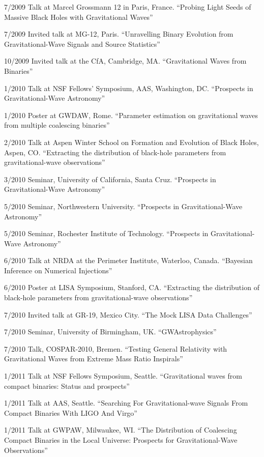 \documentclass[margin,line]{res}
\begin{document}
\begin{resume}
7/2009	Talk at Marcel Grossmann 12 in Paris, France.  ``Probing Light Seeds of Massive Black Holes with Gravitational Waves'' 

7/2009	Invited talk at MG-12, Paris.  ``Unravelling Binary Evolution from Gravitational-Wave Signals and Source Statistics''

10/2009	Invited talk at the CfA, Cambridge, MA.  ``Gravitational Waves from Binaries''

1/2010	Talk at NSF Fellows' Symposium, AAS, Washington, DC. ``Prospects in Gravitational-Wave Astronomy''

1/2010	Poster at GWDAW, Rome.  ``Parameter estimation on gravitational waves from multiple coalescing binaries''

2/2010	Talk at Aspen Winter School on Formation and Evolution of Black Holes, Aspen, CO.  ``Extracting the distribution of black-hole parameters from gravitational-wave observations''

3/2010	Seminar, University of California, Santa Cruz. ``Prospects in Gravitational-Wave Astronomy''

5/2010	Seminar, Northwestern University. ``Prospects in Gravitational-Wave Astronomy''

5/2010	Seminar, Rochester Institute of Technology. ``Prospects in Gravitational-Wave Astronomy''

6/2010	Talk at NRDA at the Perimeter Institute, Waterloo, Canada. ``Bayesian Inference on Numerical Injections''

6/2010	Poster at LISA Symposium, Stanford, CA.  ``Extracting the distribution of black-hole parameters from gravitational-wave observations''

7/2010	Invited talk at GR-19, Mexico City.  ``The Mock LISA Data Challenges''

7/2010	Seminar, University of Birmingham, UK.  ``GWAstrophysics''

7/2010	Talk, COSPAR-2010, Bremen.  ``Testing General Relativity with Gravitational Waves from Extreme Mass Ratio Inspirals''

1/2011 	Talk at NSF Fellows Symposium, Seattle. 	``Gravitational waves from compact binaries: Status and prospects''

1/2011 	Talk at AAS, Seattle. 	``Searching For Gravitational-wave Signals From Compact Binaries With LIGO And Virgo''

1/2011 	Talk at GWPAW, Milwaukee, WI.	 ``The Distribution of Coalescing Compact Binaries in the Local Universe: Prospects for Gravitational-Wave Observations''


\end{resume}
\end{document}
